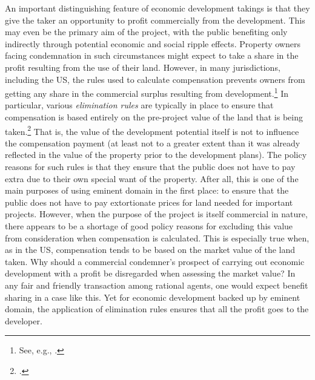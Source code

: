 {An important distinguishing feature of economic development takings is that they give the taker an opportunity to profit commercially from the development. This may even be the primary aim of the project, with the public benefiting only indirectly through potential economic and social ripple effects. Property owners facing condemnation in such circumstances might expect to take a share in the profit resulting from the use of their land. However, in many jurisdictions, including the US, the rules used to calculate compensation prevents owners from getting any share in the commercial surplus resulting from development.\footnote{See, e.g., \cite[965-966]{fennell04}.} In particular, various {\it elimination rules} are typically in place to ensure that compensation is based entirely on the pre-project value of the land that is being taken.\footcite[See][81]{freilich06} That is, the value of the development potential itself is not to influence the compensation payment (at least not to a greater extent than it was already reflected in the value of the property prior to the development plans). The policy reasons for such rules is that they ensure that the public does not have to pay extra due to their own special want of the property. After all, this is one of the main purposes of using eminent domain in the first place: to ensure that the public does not have to pay extortionate prices for land needed for important projects. However, when the purpose of the project is itself commercial in nature, there appears to be a shortage of good policy reasons for excluding this value from consideration when compensation is calculated. This is especially true when, as in the US, compensation tends to be based on the market value of the land taken. Why should a commercial condemner's prospect of carrying out economic development with a profit be disregarded when assessing the market value? In any fair and friendly transaction among rational agents, one would expect benefit sharing in a case like this. Yet for economic development backed up by eminent domain, the application of elimination rules ensures that all the profit goes to the developer. 

}
